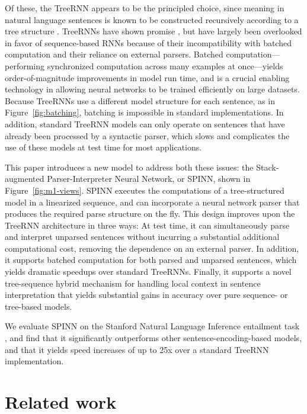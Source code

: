 \documentclass[11pt]{article}
\begin{document}
Of these, the TreeRNN appears to be the principled choice, since meaning in natural language sentences is known to be constructed recursively according to a tree structure \citep[][i.a.]{Dowty07DC}. TreeRNNs have shown promise \citep{tai2015improved,li2015tree,bowman2015trees}, but have largely been overlooked in favor of sequence-based RNNs because of their incompatibility with batched computation and their reliance on external parsers.  Batched computation---performing synchronized computation across many examples at once---yields order-of-magnitude improvements in model run time, and is a crucial enabling technology in allowing neural networks to be trained efficiently on large datasets. Because TreeRNNs use a different model structure for each sentence, as in Figure~\ref{fig:batching}, batching is impossible in standard implementations. In addition, standard TreeRNN models can only operate on sentences that have already been processed by a syntactic parser, which slows and complicates the use of these models at test time for most applications.

This paper introduces a new model to address both these issues: the Stack-augmented Parser-Interpreter Neural Network, or SPINN, shown in Figure~\ref{fig:m1-views}. SPINN executes the computations of a tree-structured model in a linearized sequence, and can incorporate a neural network parser that produces the required parse structure on the fly. This design improves upon the TreeRNN architecture in three ways: At test time, it can simultaneously parse and interpret unparsed sentences without incurring a substantial additional computational cost, removing the dependence on an external parser. In addition, it supports batched computation for both parsed and unparsed sentences, which yields dramatic speedups over standard TreeRNNs. Finally, it supports a novel tree-sequence hybrid mechanism for handling local context in sentence interpretation that yields substantial gains in accuracy over pure sequence- or tree-based models. %

We evaluate SPINN on the Stanford Natural Language Inference entailment task \citep[SNLI,][]{snli:emnlp2015}, and find that it significantly outperforms other sentence-encoding-based models, and that it yields speed increases of up to 25x over a standard TreeRNN implementation.

\section{Related work}
\end{document}
